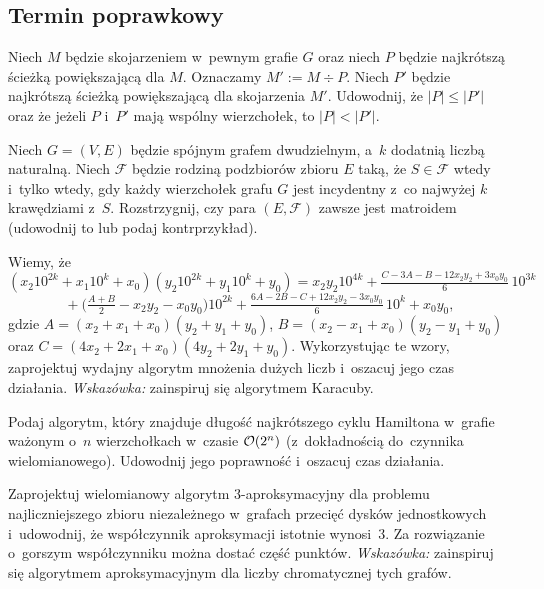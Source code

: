 \subsection{Termin poprawkowy}

\begin{zadanie}
	Niech $M$ będzie skojarzeniem w~pewnym grafie $G$ oraz niech $P$ będzie
	najkrótszą ścieżką powiększającą dla $M$. Oznaczamy $M':=M\div P$. Niech $P'$
	będzie najkrótszą ścieżką powiększającą dla skojarzenia $M'$. Udowodnij, że
	$|P|\le|P'|$ oraz że jeżeli $P$ i~$P'$ mają wspólny wierzchołek, to
	$|P|<|P'|$.
\end{zadanie}

\begin{zadanie}
	Niech $G=(V,E)$ będzie spójnym grafem dwudzielnym, a~$k$ dodatnią liczbą
	naturalną. Niech $\mathcal{F}$ będzie rodziną podzbiorów zbioru $E$ taką, że
	$S\in\mathcal{F}$ wtedy i~tylko wtedy, gdy każdy wierzchołek grafu $G$ jest
	incydentny z~co najwyżej $k$ krawędziami z~$S$. Rozstrzygnij, czy para
	$(E,\mathcal{F})$ zawsze jest matroidem (udowodnij to lub podaj kontrprzykład).
\end{zadanie}

\begin{zadanie}
	Wiemy, że
	\[
		(x_2 10^{2k}+x_1 10^{k}+x_0)(y_2 10^{2k}+y_1 10^{k}+y_0)
		= x_2 y_2 10^{4k}
		+ \tfrac{C-3A-B-12x_2y_2+3x_0y_0}{6}\,10^{3k}
	\]
	\[
		{}+\Big(\tfrac{A+B}{2}-x_2y_2-x_0y_0\Big)10^{2k}
		+ \tfrac{6A-2B-C+12x_2y_2-3x_0y_0}{6}\,10^{k}
		+ x_0 y_0,
	\]
	gdzie $A=(x_2+x_1+x_0)(y_2+y_1+y_0)$, $B=(x_2-x_1+x_0)(y_2-y_1+y_0)$ oraz
	$C=(4x_2+2x_1+x_0)(4y_2+2y_1+y_0)$. Wykorzystując te wzory, zaprojektuj
	wydajny algorytm mnożenia dużych liczb i~oszacuj jego czas działania.
	\emph{Wskazówka:} zainspiruj się algorytmem Karacuby.
\end{zadanie}

\begin{zadanie}
	Podaj algorytm, który znajduje długość najkrótszego cyklu Hamiltona w~grafie
	ważonym o~$n$ wierzchołkach w~czasie $\mathcal{O}(2^n)$ (z~dokładnością do~czynnika
	wielomianowego). Udowodnij jego poprawność i~oszacuj czas działania.
\end{zadanie}

\begin{zadanie}
	Zaprojektuj wielomianowy algorytm $3$-aproksymacyjny dla problemu
	najliczniejszego zbioru niezależnego w~grafach przecięć dysków jednostkowych
	i~udowodnij, że współczynnik aproksymacji istotnie wynosi~$3$. Za rozwiązanie
	o~gorszym współczynniku można dostać część punktów. \emph{Wskazówka:}
	zainspiruj się algorytmem aproksymacyjnym dla liczby chromatycznej tych grafów.
\end{zadanie}
